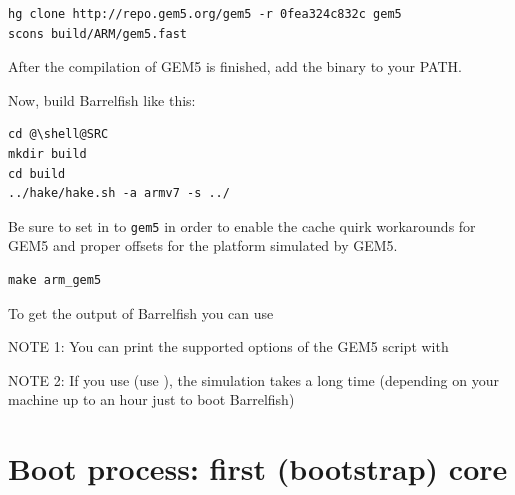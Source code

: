 \documentclass[a4paper,twoside]{report} %
\begin{document}
\begin{lstlisting}
hg clone http://repo.gem5.org/gem5 -r 0fea324c832c gem5
scons build/ARM/gem5.fast
\end{lstlisting}
After the compilation of GEM5 is finished, add the binary to your PATH.

Now, build Barrelfish like this:
\begin{lstlisting}
cd @\shell@SRC
mkdir build
cd build
../hake/hake.sh -a armv7 -s ../
\end{lstlisting}

Be sure to set  in
 to \texttt{gem5} in order to enable
the cache quirk workarounds for GEM5 and proper offsets for the
platform simulated by GEM5.

\begin{lstlisting}
make arm_gem5
\end{lstlisting}

To get the output of Barrelfish you can use 

NOTE 1: You can print the supported options of the GEM5 script with

NOTE 2: If you use  (use ), the simulation takes a long time (depending on
your machine up to an hour just to boot Barrelfish)

\section{Boot process: first (bootstrap) core}

\end{document}
